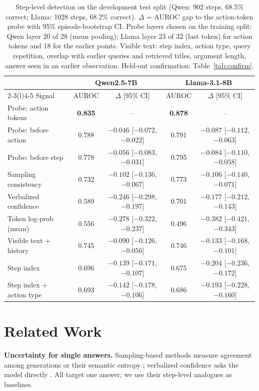 \documentclass[11pt]{article}
\begin{document}
\begin{table}[t]
\centering\small
\caption{Step-level detection on the development test split (Qwen: 902 steps, 68.5\% correct; Llama: 1028 steps,
68.2\% correct). $\Delta$ = AUROC gap to the action-token probe with 95\% episode-bootstrap CI. Probe layers chosen
on the training split: Qwen layer 20 of 28 (mean pooling); Llama layer 23 of 32 (last token) for action tokens and
18 for the earlier points. Visible text: step index, action type, query repetition, overlap with earlier queries
and retrieved titles, argument length, answer seen in an earlier observation. Held-out confirmation:
Table~\ref{tab:confirm}.}
\label{tab:rq1}
\begin{tabular}{@{}lcccc@{}}
\toprule
& \multicolumn{2}{c}{Qwen2.5-7B} & \multicolumn{2}{c}{Llama-3.1-8B} \\
\cmidrule(lr){2-3}\cmidrule(l){4-5}
Signal & AUROC & $\Delta$ [95\% CI] & AUROC & $\Delta$ [95\% CI] \\
\midrule
Probe: action tokens & \textbf{0.835} & -- & \textbf{0.878} & -- \\
Probe: before action & 0.788 & $-0.046$ [$-0.072$, $-0.022$] & 0.791 & $-0.087$ [$-0.112$, $-0.063$] \\
Probe: before step & 0.778 & $-0.056$ [$-0.083$, $-0.031$] & 0.795 & $-0.084$ [$-0.110$, $-0.058$] \\
Sampling consistency & 0.732 & $-0.102$ [$-0.136$, $-0.067$] & 0.773 & $-0.106$ [$-0.140$, $-0.071$] \\
Verbalized confidence & 0.589 & $-0.246$ [$-0.298$, $-0.197$] & 0.701 & $-0.177$ [$-0.212$, $-0.143$] \\
Token log-prob (mean) & 0.556 & $-0.278$ [$-0.322$, $-0.237$] & 0.496 & $-0.382$ [$-0.421$, $-0.343$] \\
\midrule
Visible text + history & 0.745 & $-0.090$ [$-0.126$, $-0.056$] & 0.746 & $-0.133$ [$-0.168$, $-0.101$] \\
Step index & 0.696 & $-0.139$ [$-0.171$, $-0.107$] & 0.675 & $-0.204$ [$-0.236$, $-0.172$] \\
Step index + action type & 0.693 & $-0.142$ [$-0.178$, $-0.106$] & 0.686 & $-0.193$ [$-0.228$, $-0.160$] \\
\bottomrule
\end{tabular}
\end{table}

\section{Related Work}
\textbf{Uncertainty for single answers.} Sampling-based methods measure agreement among generations
\citep{wang2023selfconsistency} or their semantic entropy \citep{kuhn2023semantic,farquhar2024detecting};
verbalized confidence asks the model directly \citep{xiong2024can}. All target one answer; we use their step-level
analogues as baselines.
\end{document}
